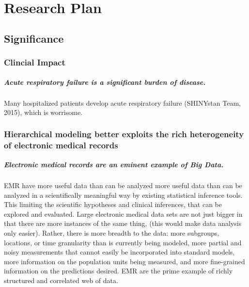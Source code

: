 \documentclass[]{article}
\title{}
\author{}
\date{}
\begin{document}
\maketitle


\section{Research Plan}\label{research-plan}

\subsection{Significance}\label{significance}

\subsubsection{Clincial Impact}\label{clincial-impact}

\subparagraph{Acute respiratory failure is a significant burden of
disease.}\label{acute-respiratory-failure-is-a-significant-burden-of-disease.}

Many hospitalized patients develop acute respiratory failure (SHINYstan
Team, 2015), which is worrisome.

\subsubsection{Hierarchical modeling better exploits the rich
heterogeneity of electronic medical
records}\label{hierarchical-modeling-better-exploits-the-rich-heterogeneity-of-electronic-medical-records}

\subparagraph{Electronic medical records are an eminent example of Big
Data.}\label{electronic-medical-records-are-an-eminent-example-of-big-data.}

EMR have more useful data than can be analyzed more useful data than can
be analyzed in a scientifically meaningful way by existing statistical
inference tools. This limiting the scientific hypotheses and clinical
inferences, that can be explored and evaluated. Large electronic medical
data sets are not just bigger in that there are more instances of the
same thing, (this would make data analysis only easier). Rather, there
is more breadth to the data: more subgroups, locations, or time
granularity than is currently being modeled, more partial and noisy
measurements that cannot easily be incorporated into standard models,
more information on the population units being measured, and more
fine-grained information on the predictions desired. EMR are the prime
example of richly structured and correlated web of data.
\end{document}
